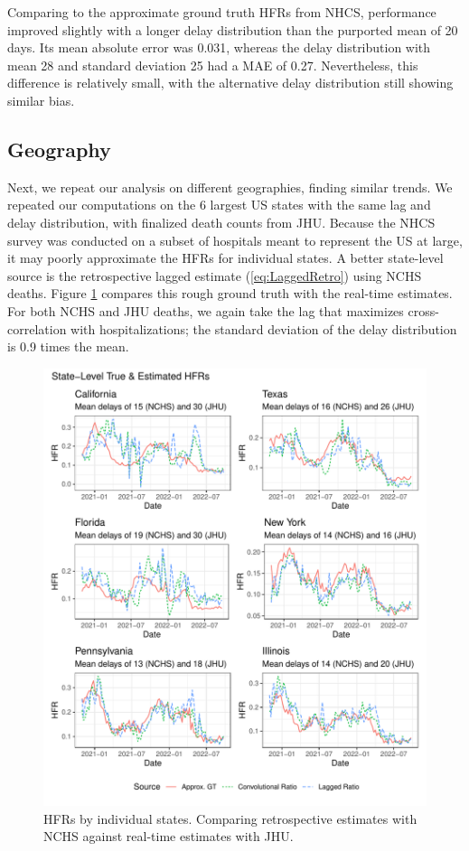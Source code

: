 \documentclass{article}
\begin{document}
Comparing to the approximate ground truth HFRs from NHCS, performance improved slightly with a longer delay distribution than the purported mean of 20 days. Its mean absolute error was 0.031, whereas the delay distribution with mean 28 and standard deviation 25 had a MAE of 0.27. Nevertheless, this difference is relatively small, with the alternative delay distribution still showing similar bias.

\subsection{Geography}

Next, we repeat our analysis on different geographies, finding similar trends. We repeated our computations on the 6 largest US states with the same lag and delay distribution, with finalized death counts from JHU. Because the NHCS survey was conducted on a subset of hospitals meant to represent the US at large, it may poorly approximate the HFRs for individual states. A better state-level source is the retrospective lagged estimate (\ref{eq:LaggedRetro}) using NCHS deaths. Figure \ref{fig:state-level} compares this rough ground truth with the real-time estimates. For both NCHS and JHU deaths, we again take the lag that maximizes cross-correlation with hospitalizations; the standard deviation of the delay distribution is 0.9 times the mean. 

 \begin{figure}
     \centering
     \includegraphics[width=0.8\linewidth]{Figs/Real/state_level_hfrs.pdf}
     \caption{HFRs by individual states. Comparing retrospective estimates with NCHS against real-time estimates with JHU.}
     \label{fig:state-level}
 \end{figure}
\end{document}
